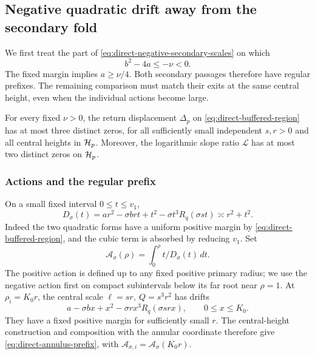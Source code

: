 \subsection{Negative quadratic drift away from the secondary fold}
\label{sec:direct-buffered-negative}

We first treat the part of
\eqref{eq:direct-negative-secondary-scales} on which
\begin{equation}
\label{eq:direct-buffered-region}
 b^2-4a\le-\nu<0 .
\end{equation}
The fixed margin implies \(a\ge\nu/4\). Both secondary passages therefore
have regular prefixes. The remaining comparison must match their exits
at the same central height, even when the individual actions become
large.

\begin{proposition}
\label{prop:direct-buffered-negative}
For every fixed \(\nu>0\), the return displacement \(\Delta_p\) on
\eqref{eq:direct-buffered-region} has at most
three distinct zeros, for all sufficiently small independent
\(s,r>0\) and all central heights in \(\mathcal H_p\).
Moreover, the logarithmic slope ratio \(\mathcal L\) has
at most two distinct zeros on \(\mathcal H_p\).
\end{proposition}

\subsubsection{Actions and the regular prefix}

On a small fixed interval \(0\le t\le v_1\),
\[
 D_\sigma(t)=ar^2-\sigma brt+t^2
                    -\sigma t^3R_q(\sigma st)
                 \asymp r^2+t^2.
\]
Indeed the two quadratic forms have a uniform positive
margin by \eqref{eq:direct-buffered-region}, and the cubic
term is absorbed by reducing \(v_1\).
Set
\begin{equation}
\label{eq:direct-buffered-actions}
 \mathcal A_\sigma(\rho)=
                    \int_0^\rho t/D_\sigma(t)\,dt .
\end{equation}
The positive action is defined up to any fixed positive primary radius;
we use the negative action first on compact subintervals below its
far root near \(\rho=1\).
At \(\rho_i=K_0r\), the central scale
\(\ell=sr,\ Q=s^3r^2\) has drifts
\[
 a-\sigma bx+x^2-\sigma rx^3R_q(\sigma srx),
                 \qquad 0\le x\le K_0 .
\]
They have a fixed positive margin for sufficiently small \(r\).
The central-height construction and composition with the
annular coordinate therefore give
\eqref{eq:direct-annulus-prefix}, with
\(\mathcal A_{\sigma,i}=\mathcal A_\sigma(K_0r)\).


